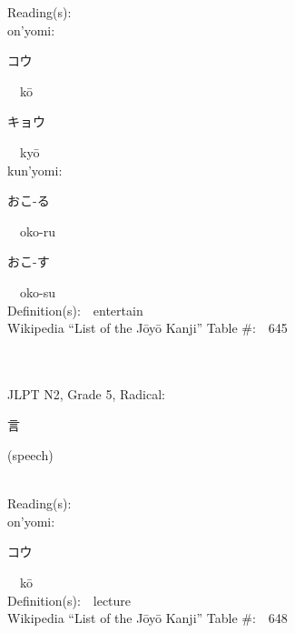 \begin{multicols}{2}
Reading(s):\ \ \\
{\hspace*{1em}}on'yomi:\ \ \\
{\hspace*{2em}}{\begin{CJK}{UTF8}{min} コウ \end{CJK}}\ \ k\=o\ \ \\
{\hspace*{2em}}{\begin{CJK}{UTF8}{min} キョウ \end{CJK}}\ \ ky\=o\ \ \\
{\hspace*{1em}}kun'yomi:\ \ \\
{\hspace*{2em}}{\begin{CJK}{UTF8}{min} おこ-る \end{CJK}}\ \ oko-ru\ \ \\
{\hspace*{2em}}{\begin{CJK}{UTF8}{min} おこ-す \end{CJK}}\ \ oko-su\ \ \\
Definition(s):\ \ entertain \\
Wikipedia ``List of the J\=oy\=o Kanji'' Table \#:\ \ 645 \\
\ \ \\
{\fontsize{34pt}{40pt}  }\ \ \\  %
{JLPT N2, Grade 5, Radical:\ \ {\begin{CJK}{UTF8}{min} 言 \end{CJK}} (speech) } \\
Reading(s):\ \ \\
{\hspace*{1em}}on'yomi:\ \ \\
{\hspace*{2em}}{\begin{CJK}{UTF8}{min} コウ \end{CJK}}\ \ k\=o\ \ \\
Definition(s):\ \ lecture \\
Wikipedia ``List of the J\=oy\=o Kanji'' Table \#:\ \ 648 \\
\ \ \\
{\fontsize{34pt}{40pt}  }\ \ \\  %

\end{multicols}
